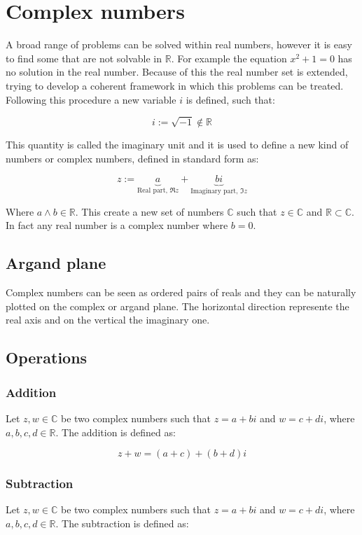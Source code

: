 \chapter{Complex numbers}
A broad range of problems can be solved within real numbers, however it is easy to find some that are not solvable in $\mathbb{R}$.
For example the equation $x^2+1=0$ has no solution in the real number.
Because of this the real number set is extended, trying to develop a coherent framework in which this problems can be treated.
Following this procedure a new variable $i$ is defined, such that:

$$i := \sqrt{-1}\not\in\mathbb{R}$$

This quantity is called the imaginary unit and it is used to define a new kind of numbers or complex numbers, defined in standard form as:

$$z := \underbrace{a}_{\text{Real part, }\Re{z}} + \underbrace{bi}_{\text{Imaginary part, }\Im{z}}$$

Where $a\land b\in\mathbb{R}$.
This create a new set of numbers $\mathbb{C}$ such that $z\in\mathbb{C}$ and $\mathbb{R}\subset\mathbb{C}$.
In fact any real number is a complex number where $b=0$.

\section{Argand plane}
Complex numbers can be seen as ordered pairs of reals and they can be naturally plotted on the complex or argand plane.
The horizontal direction represente the real axis and on the vertical the imaginary one.

\section{Operations}

	\subsection{Addition}
	Let $z, w\in\mathbb{C}$ be two complex numbers such that $z = a+bi$ and $w = c+di$, where $a,b,c,d\in\mathbb{R}$.
	The addition is defined as:

	$$z+w = (a+c) + (b+d)i$$

	\subsection{Subtraction}
	Let $z, w\in\mathbb{C}$ be two complex numbers such that $z = a+bi$ and $w = c+di$, where $a,b,c,d\in\mathbb{R}$.
	The subtraction is defined as:

